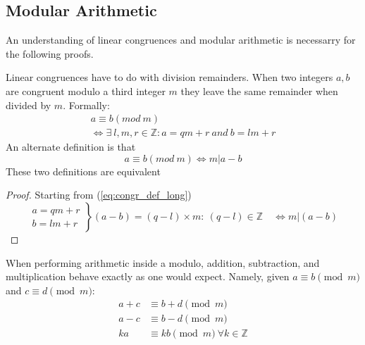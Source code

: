 \documentclass[12pt]{article}
\begin{document}
    \subsection{Modular Arithmetic}
        An understanding of linear congruences and modular arithmetic is
        necessarry for the following proofs.

        Linear congruences have to do with division remainders. When two
        integers $a, b$ are congruent modulo a third integer $m$ they leave the
        same remainder when divided by $m$. Formally:
        \begin{equation}\label{eq:congr_def_long}
            \begin{gathered}
                a \equiv b (mod\: m) \\
                \iff \exists\ l,m,r \in \mathbb{Z}: a = qm + r\ and\ b = lm + r
            \end{gathered}
        \end{equation}
        An alternate definition is that 
        \begin{equation*}
            a \equiv b (mod\: m) \iff m | a-b
        \end{equation*}
        These two definitions are equivalent
        \begin{proof}
            Starting from (\ref{eq:congr_def_long})
            \begin{equation*}
                \left. 
                    \begin{aligned}
                        a = qm + r\\ 
                        b = lm + r
                    \end{aligned}
                \right\}
                (a - b) = (q-l)\times m :\: (q-l) \in \mathbb{Z}\quad \iff m | (a-b)
            \end{equation*}
        \end{proof}

        When performing arithmetic inside a modulo, addition, subtraction, and
        multiplication behave exactly as one would expect. Namely, given
        $a\equiv b\pmod{m}$ and $c\equiv d\pmod{m}$:
        \begin{align*}
            a + c &\equiv b + d \pmod{m}\\
            a - c &\equiv b - d \pmod{m}\\
            ka 	  &\equiv kb \pmod{m}\ \forall k \in \mathbb{Z} 
        \end{align*}
\end{document}

